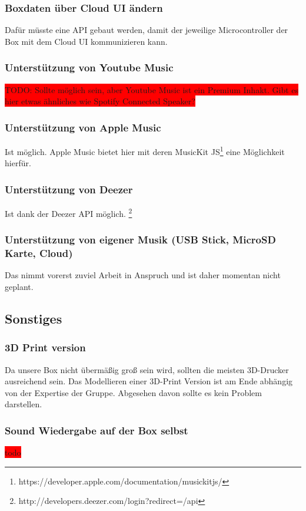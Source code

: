 \documentclass[10pt, a4paper, draft]{article}
\begin{document}
\subsubsection{Boxdaten über Cloud UI ändern}
Dafür müsste eine API gebaut werden, damit der jeweilige Microcontroller der Box mit dem Cloud UI kommunizieren kann.

\subsubsection{Unterstützung von Youtube Music}
\colorbox{red}{TODO: Sollte möglich sein, aber Youtube Music ist ein Premium Inhakt. Gibt es hier etwas ähnliches wie Spotify Connected Speaker?}
\subsubsection{Unterstützung von Apple Music}
Ist möglich. Apple Music bietet hier mit deren MusicKit JS\footnote{https://developer.apple.com/documentation/musickitjs/} eine Möglichkeit hierfür.
\subsubsection{Unterstützung von Deezer}
Ist dank der Deezer API möglich. \footnote{http://developers.deezer.com/login?redirect=/api}
\subsubsection{Unterstützung von eigener Musik (USB Stick, MicroSD Karte, Cloud)}
Das nimmt vorerst zuviel Arbeit in Anspruch und ist daher momentan nicht geplant.

\subsection{Sonstiges}
\subsubsection{3D Print version}
Da unsere Box nicht übermäßig groß sein wird, sollten die meisten 3D-Drucker ausreichend sein. Das Modellieren einer 3D-Print Version ist am Ende abhängig von der Expertise der Gruppe. Abgesehen davon sollte es kein Problem darstellen.

\subsubsection{Sound Wiedergabe auf der Box selbst}
\colorbox{red}{todo}
\end{document}
